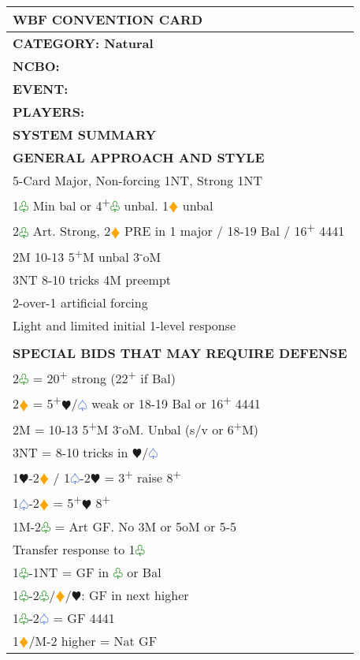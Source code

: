 \documentclass{article}
\renewcommand{\sp}{\textcolor{RoyalBlue}{$\varspade$}}
\newcommand{\he}{\textcolor{RubineRed}{$\varheart$}}
\newcommand{\di}{\textcolor{Orange}{$\vardiamond$}}
\newcommand{\cl}{\textcolor{Green}{$\varclub$}}
\newcommand{\nt}{\relsize{-1}NT\relsize{1}}
\newcommand{\up}{\textsuperscript{+}}
\newcommand{\down}{\textsuperscript{-}}
\begin{document}
\begin{minipage}{90mm}
	\begin{tabular}{| p{88mm} |}
		\hline
		\cellcolor[gray]{0.9} \textbf{WBF CONVENTION CARD} \\ \hline
		\textbf{CATEGORY: Natural} \\
		\textbf{NCBO:} \\
		\textbf{EVENT:} \\
		\textbf{PLAYERS:} \\
		\cellcolor[gray]{0.9} \textbf{SYSTEM SUMMARY} \\ \hline
		\cellcolor[gray]{0.9} \textbf{GENERAL APPROACH AND STYLE} \\ \hline
		5-Card Major, Non-forcing 1\nt{}, Strong 1\nt{}\\ \hline
		1\cl{} Min bal or 4\up{}\cl{} unbal. 1\di{} unbal \\ \hline
		2\cl{} Art. Strong, 2\di{} PRE in 1 major / 18-19 Bal / 16\up{} 4441 \\ \hline
		2M 10-13 5\up{}M unbal 3\down{}oM \\ \hline
		3\nt{} 8-10 tricks 4M preempt \\ \hline
		2-over-1 artificial forcing \\ \hline
		Light and limited initial 1-level response \\ \hline
		\\ \hline
		\cellcolor[gray]{0.9} \textbf{SPECIAL BIDS THAT MAY REQUIRE DEFENSE} \\ \hline
		2\cl{} = 20\up{} strong (22\up{} if Bal) \\ \hline
		2\di{} = 5\up{}\he{}/\sp{} weak or 18-19 Bal or 16\up{} 4441 \\ \hline
		2M = 10-13 5\up{}M 3\down{}oM. Unbal (s/v or 6\up{}M)\\ \hline
		3\nt{} = 8-10 tricks in \he{}/\sp{} \\ \hline
		1\he{}-2\di{} / 1\sp{}-2\he{} = 3\up{} raise 8\up{} \\ \hline
		1\sp{}-2\di{} = 5\up{}\he{} 8\up{} \\ \hline
		1M-2\cl{} = Art GF. No 3M or 5oM or 5-5 \\ \hline
		Transfer response to 1\cl{} \\ \hline
		1\cl{}-1\nt{} = GF in \cl{} or Bal \\ \hline
		1\cl{}-2\cl{}/\di{}/\he{}: GF in next higher \\ \hline
		1\cl{}-2\sp{} = GF 4441 \\ \hline
		1\di{}/M-2 higher = Nat GF \\ \hline

\end{tabular}
\end{minipage}
\end{document}
